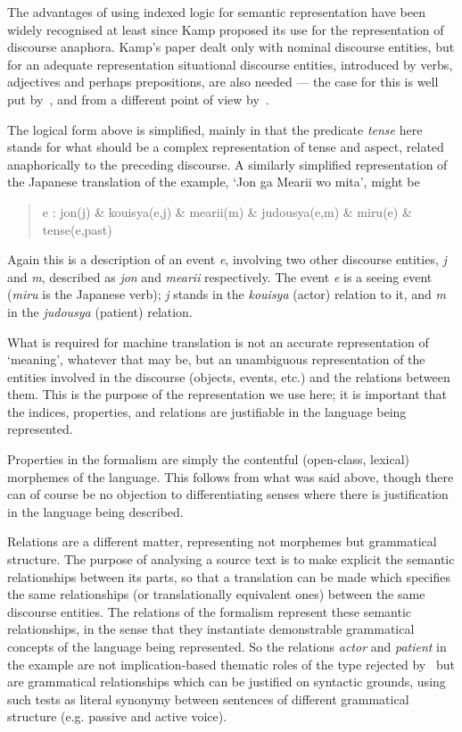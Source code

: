 The advantages of using indexed logic for semantic representation have
been widely recognised at least since Kamp proposed its use for the
representation of discourse anaphora.
Kamp's paper dealt only with nominal discourse entities, but for an
adequate representation situational discourse entities, introduced by
verbs, adjectives and perhaps prepositions, are also needed --- the
case for this is well put by~\cite{parsons:90:a},
and from a different point of view by~\cite{asher:93:a}.

The logical form above is simplified, mainly in that the predicate
{\it tense\/}
here stands for what should be a complex representation of tense and
aspect, related anaphorically to the preceding discourse.
A similarly simplified representation of the Japanese translation of the
example, `Jon ga Mearii wo mita', might be
\begin{quote}
  \smallskip
  \small
  e : jon(j) \& kouisya(e,j) \& mearii(m) \&
  judousya(e,m) \& miru(e) \& tense(e,past)
\end{quote}
Again this is a description of an event
{\it e},
involving two other discourse entities,
{\it j\/}
and
{\it m},
described as
{\it jon\/}
and
{\it mearii\/}
respectively. The event
{\it e\/}
is a seeing event ({\it miru\/} is the Japanese verb);
{\it j\/}
stands in the
{\it kouisya\/}
(actor) relation to it, and
{\it m\/}
in the
{\it judousya\/}
(patient) relation.

What is required for machine translation is not an accurate
representation of `meaning', whatever that may be, but an unambiguous
representation of the entities involved in the discourse (objects,
events, etc.) and the relations between them. This is the purpose of the
representation we use here; it is important that the indices,
properties, and relations are justifiable in the language being
represented.

Properties in the formalism are simply the contentful (open-class,
lexical) morphemes of the language.
This follows from what was said above, though there can of course be no
objection to differentiating senses where there is justification in the
language being described.

Relations are a different matter, representing not morphemes but
grammatical structure.
The purpose of analysing a source text is to make explicit the semantic
relationships between its parts, so that a translation can be made which
specifies the same relationships (or translationally equivalent ones)
between the same discourse entities.
The relations of the formalism represent these semantic relationships,
in the sense that they instantiate demonstrable grammatical concepts of
the language being represented.
So the relations
{\it actor\/}
and
{\it patient\/}
in the example are not implication-based thematic roles of the type
rejected by~\cite{dowty:89:a} but are grammatical relationships
which can be justified on syntactic grounds, using such tests as literal
synonymy between sentences of different grammatical structure
(e.g. passive and active voice).

